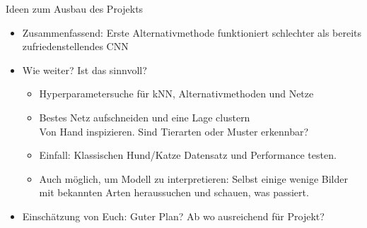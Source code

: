 \documentclass[aspectratio=1610, 9pt]{beamer}
\begin{document}
\begin{frame}{Ideen zum Ausbau des Projekts}

  \begin{itemize}
    \item Zusammenfassend: Erste Alternativmethode funktioniert schlechter als bereits zufriedenstellendes CNN
    \item Wie weiter? Ist das sinnvoll?
    \begin{itemize}
      \item Hyperparametersuche für kNN, Alternativmethoden und Netze
      \item Bestes Netz aufschneiden und eine Lage clustern\\
      \rightarrow{} Von Hand inspizieren. Sind Tierarten oder Muster erkennbar?
      \item Einfall: Klassischen Hund/Katze Datensatz und Performance testen.
      \item Auch möglich, um Modell zu interpretieren: Selbst einige wenige Bilder mit bekannten Arten heraussuchen und schauen, was passiert.
    \end{itemize}
    \item Einschätzung von Euch: Guter Plan? Ab wo ausreichend für Projekt?
  \end{itemize}

\end{frame}
\end{document}

